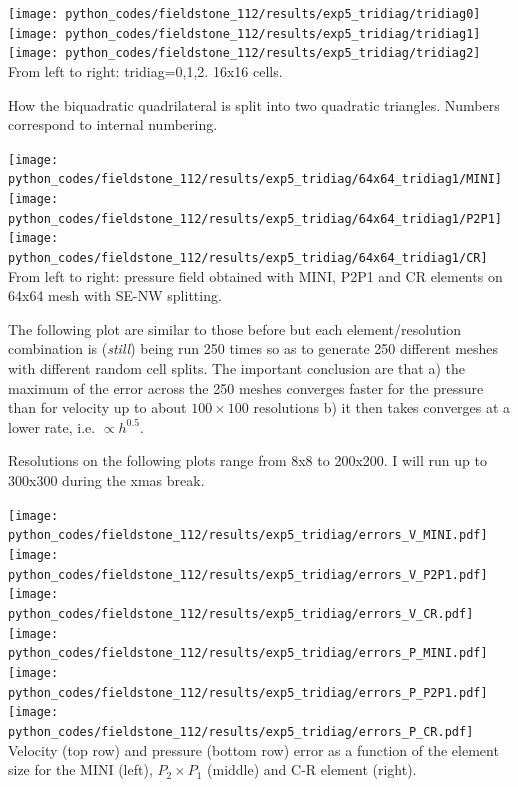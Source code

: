 \begin{center}
\texttt{[image: python\_codes/fieldstone\_112/results/exp5\_tridiag/tridiag0]}
\texttt{[image: python\_codes/fieldstone\_112/results/exp5\_tridiag/tridiag1]}
\texttt{[image: python\_codes/fieldstone\_112/results/exp5\_tridiag/tridiag2]}\\
{\captionfont From left to right: tridiag=0,1,2. 16x16 cells.}
\end{center}

\begin{center}

{\captionfont How the biquadratic quadrilateral is split into two quadratic triangles. 
Numbers correspond to internal numbering.}
\end{center}

\vspace{1cm}

\begin{center}
\texttt{[image: python\_codes/fieldstone\_112/results/exp5\_tridiag/64x64\_tridiag1/MINI]}
\texttt{[image: python\_codes/fieldstone\_112/results/exp5\_tridiag/64x64\_tridiag1/P2P1]}
\texttt{[image: python\_codes/fieldstone\_112/results/exp5\_tridiag/64x64\_tridiag1/CR]}\\
{\captionfont From left to right: pressure field obtained with MINI, P2P1 and CR elements on 64x64 mesh
with SE-NW splitting.}
\end{center}



\newpage
The following plot are similar to those before but each element/resolution combination is (\textit{still}) being run 
250 times so as to generate 250 different meshes with different random cell splits. The important conclusion
are that a) the maximum of the error across the 250 meshes converges faster for the pressure than for velocity
up to about $100\times 100$ resolutions b) it then takes converges at a lower rate, i.e. $\propto h^{0.5}$. 

Resolutions on the following plots range from 8x8 to 200x200. I will run up to 300x300 during the xmas break.

\begin{center}
\texttt{[image: python\_codes/fieldstone\_112/results/exp5\_tridiag/errors\_V\_MINI.pdf]}
\texttt{[image: python\_codes/fieldstone\_112/results/exp5\_tridiag/errors\_V\_P2P1.pdf]}
\texttt{[image: python\_codes/fieldstone\_112/results/exp5\_tridiag/errors\_V\_CR.pdf]}\\
\texttt{[image: python\_codes/fieldstone\_112/results/exp5\_tridiag/errors\_P\_MINI.pdf]}
\texttt{[image: python\_codes/fieldstone\_112/results/exp5\_tridiag/errors\_P\_P2P1.pdf]}
\texttt{[image: python\_codes/fieldstone\_112/results/exp5\_tridiag/errors\_P\_CR.pdf]}\\
{\captionfont Velocity (top row) and pressure (bottom row) error as a function of the element size
for the MINI (left), $P_2\times P_1$ (middle) and C-R element (right).}
\end{center}



